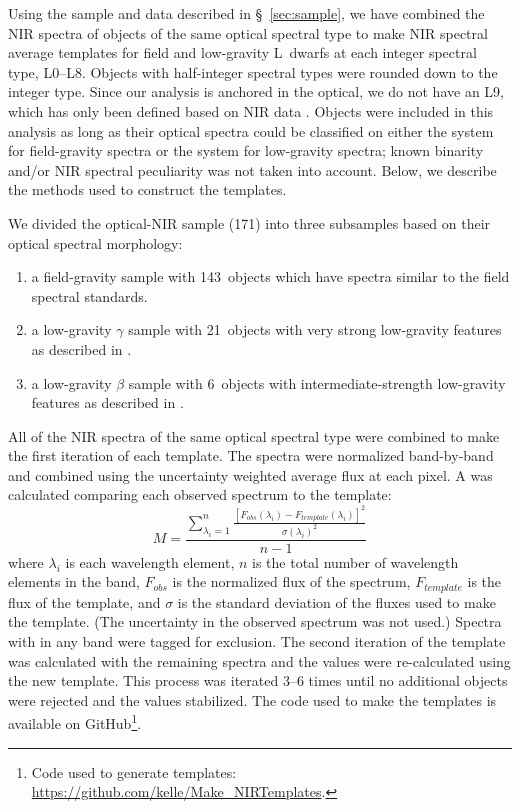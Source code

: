 \documentclass[modern]{aastex61}
\newcommand{\sample}{171}
\newcommand{\optField}{143}
\newcommand{\optBeta}{6}
\newcommand{\optGamma}{21}
\begin{document}
Using the sample and data described in \S~\ref{sec:sample}, we have combined the NIR spectra of objects of the same optical spectral type to make NIR spectral average templates for field and low-gravity L~dwarfs at each integer spectral type,  L0--L8. Objects with half-integer spectral types were rounded down to the integer type.
Since our analysis is anchored in the optical, we do not have an L9, which has only been defined based on NIR data \citep{K99,Geballe02}.
Objects were included in this analysis as long as their optical spectra could be classified on either the \citet{K99} system for field-gravity spectra or the \citet{Cruz09_lowg} system for low-gravity spectra; known binarity and/or NIR spectral peculiarity was not taken into account.
Below, we describe the methods used to construct the templates.

We divided the optical-NIR sample (\sample) into three subsamples based on their optical spectral morphology:
\begin{enumerate}
	\item a field-gravity sample with \optField~objects which have spectra similar to the \citet{K99} field spectral standards.
	\item a low-gravity $\gamma$ sample with \optGamma~objects with very strong low-gravity features as described in \citet{Cruz09_lowg}.
	\item a low-gravity $\beta$ sample with \optBeta~objects with intermediate-strength low-gravity features as described in \citet{Cruz09_lowg}.
\end{enumerate}

All of the NIR spectra of the same optical spectral type were combined to make the first iteration of each template.
The spectra were normalized band-by-band and combined using the uncertainty weighted average flux at each pixel.
A  was calculated comparing each observed spectrum to the template:
\begin{equation}
M=\frac{\sum_{\lambda_i=1}^{n} \frac{[F_{obs}(\lambda_i) - F_{template}(\lambda_i)]^2}{\sigma(\lambda_i)^2}}{n-1}
\end{equation}
where $\lambda_i$ is each wavelength element, $n$ is the total number of wavelength elements in the band, $F_{obs}$ is the normalized flux of the spectrum, $F_{template}$ is the flux of the template, and $\sigma$ is the standard deviation of the fluxes used to make the template. (The uncertainty in the observed spectrum was not used.)
Spectra with  in any band were tagged for exclusion.
The second iteration of the template was calculated with the remaining spectra and the  values were re-calculated using the new template.
This process was iterated 3--6 times until no additional objects were rejected and the  values stabilized. The code used to make the templates is available on GitHub\footnote{Code used to generate templates: \url{https://github.com/kelle/Make_NIRTemplates}.}.
\end{document}
